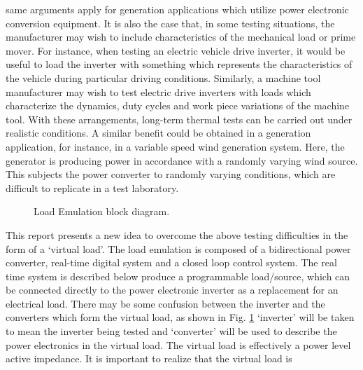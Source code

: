 same arguments apply for generation applications which utilize power electronic conversion equipment. It is also the case that, in some testing situations, the manufacturer may wish to include characteristics of the mechanical load or prime mover. For instance, when
testing an electric vehicle drive inverter, it would be useful to load the inverter with something which represents the characteristics of the vehicle during particular driving conditions. Similarly, a machine tool manufacturer may wish to test electric drive inverters with loads which characterize the dynamics, duty cycles and work piece variations of the machine tool. With these arrangements, long-term thermal tests can be carried out under realistic conditions. A similar benefit could be obtained in a generation application, for instance, in a variable speed wind generation system. Here, the generator is producing power in accordance with a randomly varying wind source. This subjects the power converter to randomly varying conditions, which are difficult to replicate in a test laboratory.\par
\begin{figure}[ht]
\centering
{}
\caption{Load Emulation block diagram.}
\label{vmb}
\end{figure}
This report presents a new idea to overcome the above testing difficulties in the form of a `virtual load'. The load emulation is composed of a bidirectional power converter, real-time digital system and a closed loop control system. The real time system is described below  produce a programmable load/source, which can be connected directly to the power electronic inverter as a replacement for an electrical load. There may be some confusion between the inverter and the converters which form the virtual load, as shown in Fig. \ref{vmb} `inverter' will be taken to mean the inverter being tested and `converter' will be used to describe the power electronics in the virtual load. The virtual load is effectively a power level active impedance. It is important to realize that the virtual load is
